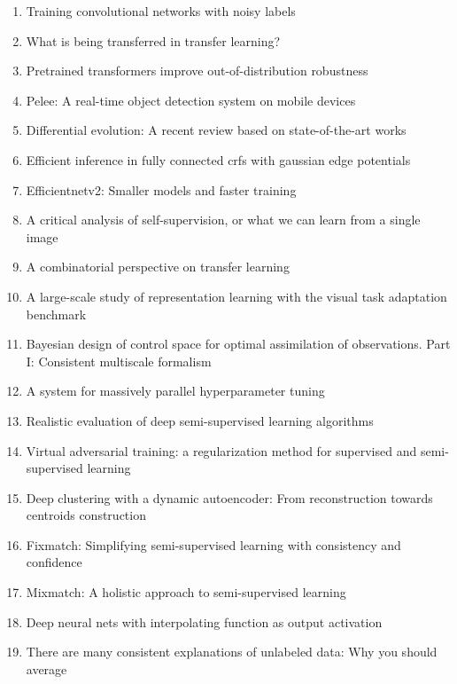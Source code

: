 \documentclass[acmlarge]{acmart}
\begin{document}
\begin{enumerate}
	\item Training convolutional networks with noisy labels \cite{sukhbaatar2014training}
	\item What is being transferred in transfer learning? \cite{neyshabur2020being}
	\item Pretrained transformers improve out-of-distribution robustness \cite{hendrycks2020pretrained}
	\item Pelee: A real-time object detection system on mobile devices \cite{wang2018pelee}
	\item Differential evolution: A recent review based on state-of-the-art works \cite{ahmad2021differential}
	\item Efficient inference in fully connected crfs with gaussian edge potentials \cite{krahenbuhl2011efficient}
	\item Efficientnetv2: Smaller models and faster training \cite{tan2021efficientnetv2}
	\item A critical analysis of self-supervision, or what we can learn from a single image \cite{asano2019critical}
	\item A combinatorial perspective on transfer learning \cite{wang2020combinatorial}
	\item A large-scale study of representation learning with the visual task adaptation benchmark \cite{zhai2019large}
	\item Bayesian design of control space for optimal assimilation of observations. Part I: Consistent multiscale formalism \cite{bocquet2011bayesian}
	\item A system for massively parallel hyperparameter tuning \cite{li2020system}
	\item Realistic evaluation of deep semi-supervised learning algorithms \cite{oliver2018realistic}
	\item Virtual adversarial training: a regularization method for supervised and semi-supervised learning \cite{miyato2018virtual}
	\item Deep clustering with a dynamic autoencoder: From reconstruction towards centroids construction \cite{mrabah2020deep}
	\item Fixmatch: Simplifying semi-supervised learning with consistency and confidence \cite{sohn2020fixmatch}
	\item Mixmatch: A holistic approach to semi-supervised learning \cite{berthelot2019mixmatch}
	\item Deep neural nets with interpolating function as output activation \cite{wang2018deep}
	\item There are many consistent explanations of unlabeled data: Why you should average \cite{athiwaratkun2018there}

\end{enumerate}
\end{document}
